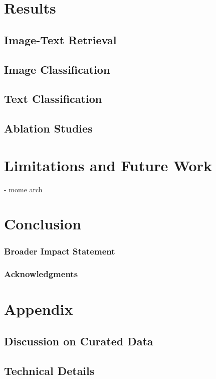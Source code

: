 \documentclass[10pt]{article} %
\begin{document}
\section{Results}
\subsection{Image-Text Retrieval}
\subsection{Image Classification}
\subsection{Text Classification}
\subsection{Ablation Studies}
\section{Limitations and Future Work}
- mome arch
\section{Conclusion}


\subsubsection*{Broader Impact Statement}




\subsubsection*{Acknowledgments}





\appendix
\section{Appendix}
\subsection{Discussion on Curated Data} \label{curated_data}

\subsection{Technical Details}
\end{document}
